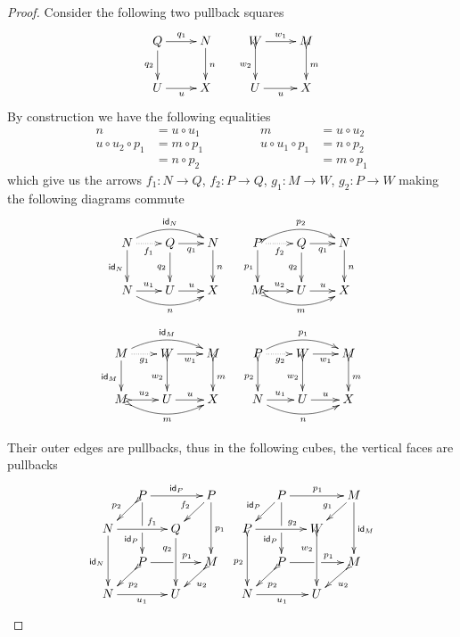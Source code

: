 \begin{proof}
	Consider the following two pullback squares
	\[\xymatrix{Q \ar[r]^{q_1} \ar[d]_{q_2} & N\ar[d]^{n} & W \ar[r]^{w_1} \ar@{>->}[d]_{w_2}& M\ar@{>->}[d]^{m}\\
		U \ar[r]_{u}& X & U \ar[r]_{u}& X}\]
	By construction we have the following equalities 
	\[\begin{split}
		n&=u\circ u_1  \qquad \\
		u\circ u_2 \circ p_1&=m\circ p_1\\&=n\circ p_2
	\end{split}\qquad \begin{split}
		m&=u\circ u_2\\ u\circ u_1\circ p_1&=n\circ p_2\\&=m\circ p_1
	\end{split}\]
	which give us the arrows $f_1\colon N\to Q$, $f_2\colon P\to Q$, $g_1\colon M\to W$, $g_2\colon P\to W$ making the following diagrams commute
	\[\xymatrix@C=20pt{N\ar@/^.4cm/[rr]^{\id{N}}\ar@{.>}[r]_{f_1}  \ar[d]_{\id{N}} &Q\ar[r]_{q_1} \ar[d]_{q_2} & N \ar[d]^{n}  &P\ar@{>->}@/^.4cm/[rr]^{p_2}\ar@{.>}[r]_{f_2}  \ar[d]_{p_1} &Q\ar[r]_{q_1} \ar[d]_{q_2} & N \ar[d]^{n}
		\\ N \ar@/_.4cm/[rr]_{n}\ar[r]^{u_1} & U \ar[r]^{u}  & X  & M\ar@{>->}@/_.4cm/[rr]_{m}\ar@{>->}[r]^{u_2}   &U\ar[r]^{u}  & X }\]
	\[\xymatrix@C=20pt{M\ar@/^.4cm/[rr]^{\id{M}}\ar@{.>}[r]_{g_1}  \ar[d]_{\id{M}} &W\ar[r]_{w_1} \ar@{>->}[d]_{w_2} & M \ar@{>->}[d]^{m} & P\ar@/^.4cm/[rr]^{p_1}\ar@{.>}[r]_{g_2}  \ar@{>->}[d]_{p_2} &W\ar[r]_{w_1} \ar@{>->}[d]_{w_2} & M \ar@{>->}[d]^{m}
		\\ M \ar@{>->}@/_.4cm/[rr]_{m}\ar@{>->}[r]^{u_2} & U \ar[r]^{u}  & X & N\ar@/_.4cm/[rr]_{n}\ar[r]^{u_1}  &U\ar[r]^{u} & X }\]	
		
	Their outer edges are pullbacks, thus in the following cubes, the vertical faces are pullbacks
	\[\xymatrix@C=13pt@R=13pt{&P\ar[dd]|\hole_(.65){\id{P}}\ar[rr]^{\id{P}} \ar@{>->}[dl]_{p_2} && P \ar[dd]^{p_1} \ar[dl]_{f_2} & & P\ar[dd]|\hole_(.65){\id{P}}\ar[rr]^{p_1} \ar[dl]_{\id{P}} && M \ar[dd]^{\id{M}} \ar[dl]_{g_1}\\ N  \ar[dd]_{\id{N}}\ar[rr]^(.65){f_1} & & Q \ar[dd]_(.3){q_2}&& P  \ar@{>->}[dd]_{p_2}\ar[rr]^(.65){g_2} & & W \ar@{>->}[dd]_(.3){w_2}\\&P\ar[rr]|\hole^(.65){p_1} \ar@{>->}[dl]^{p_2} && M \ar@{>->}[dl]^{u_2} && P\ar[rr]|\hole^(.65){p_1} \ar@{>->}[dl]^{p_2} && M \ar@{>->}[dl]^{u_2}\\N \ar[rr]_{u_1} & & U && N \ar[rr]_{u_1} & & U}\]


\end{proof}
